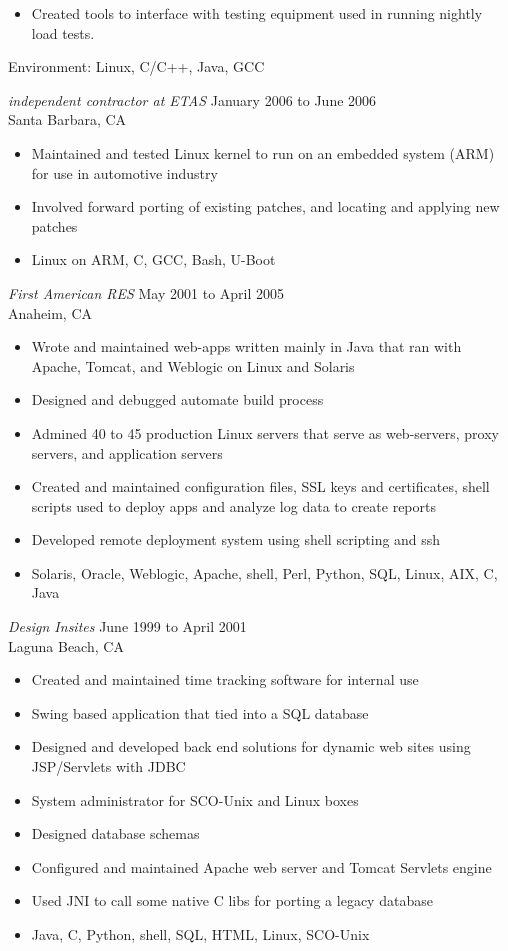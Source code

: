 \documentclass{res}
\begin{document}
\begin{resume}
\begin{itemize}
\item Created tools to interface with testing equipment used in
running nightly load tests.

\end{itemize}

Environment:  Linux, C/C++, Java, GCC

{\sl independent contractor at ETAS} \hfill January 2006 to June 2006\\
Santa Barbara, CA
\begin{itemize}
\item Maintained and tested Linux kernel to run on an embedded
system (ARM) for use in automotive industry
\item Involved forward porting of existing patches, and locating and applying
new patches
\item  Linux on ARM, C, GCC, Bash, U-Boot
\end{itemize}


{\sl First American RES} \hfill May 2001 to April 2005\\
Anaheim, CA
\begin{itemize}
\item Wrote and maintained web-apps written mainly in Java that ran
with Apache, Tomcat, and Weblogic on Linux and Solaris
\item Designed and debugged automate build process
\item Admined 40 to 45 production Linux servers that serve as
web-servers, proxy servers, and application servers
\item Created and maintained configuration files, 
SSL keys and certificates, shell scripts used to deploy apps and
analyze log data to create reports
\item Developed remote deployment system using shell scripting and
ssh
\item  Solaris, Oracle, Weblogic, Apache, shell, Perl, Python,
SQL, Linux, AIX, C, Java
\end{itemize}

{\sl Design Insites} \hfill June 1999 to April 2001\\
Laguna Beach, CA
\begin{itemize}
\item Created and maintained time tracking software for internal
use
\item Swing based application that tied into a SQL database
\item Designed and developed back end solutions for dynamic web
sites using JSP/Servlets with JDBC
\item System administrator for SCO-Unix and Linux boxes
\item Designed database schemas
\item Configured and maintained Apache web server and Tomcat Servlets
engine
\item Used JNI to call some native C libs for porting a legacy
database
\item  Java, C, Python, shell,  SQL, HTML, Linux, SCO-Unix
\end{itemize}


\end{resume}
\end{document}
